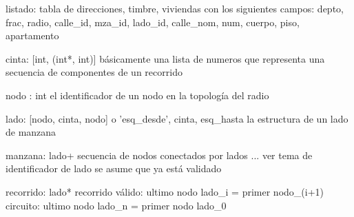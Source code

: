 listado: tabla de direcciones, timbre, viviendas con los siguientes campos:
depto, frac, radio, calle_id, mza_id, lado_id, calle_nom, num, cuerpo, piso, apartamento 

cinta: [int, (int*, int)]
básicamente una lista de numeros que representa una secuencia de componentes de un recorrido

nodo : int
el identificador de un nodo en la topología del radio

lado: [nodo, cinta, nodo] o {'esq_desde', cinta, esq_hasta}
la estructura de un lado de manzana

manzana: lado+ secuencia de nodos conectados por lados ...
ver tema de identificador de lado
se asume que ya está validado

recorrido: lado*
recorrido válido: ultimo nodo lado_i = primer nodo_(i+1)
circuito: ultimo nodo lado_n = primer nodo lado_0


